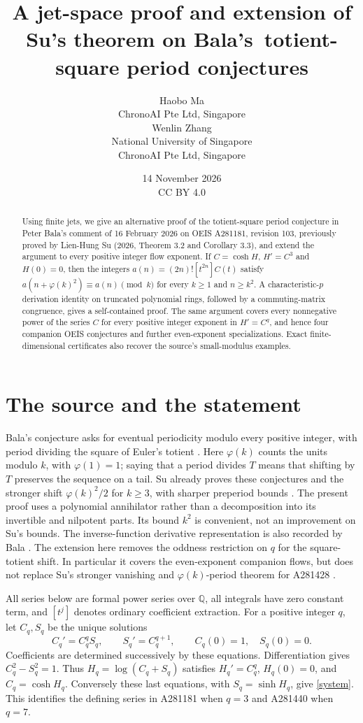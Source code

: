 \documentclass[11pt]{article}
\title{A jet-space proof and extension of Su's theorem on Bala's\ totient-square period conjectures}
\author{Haobo Ma\\\small ChronoAI Pte Ltd, Singapore
  \\[0.5em]Wenlin Zhang\\\small National University of Singapore
  \\\small ChronoAI Pte Ltd, Singapore}
\date{14 November 2026\\\small CC BY 4.0}
\newcommand{\QQ}{\mathbb Q}
\begin{document}
\maketitle
\begin{abstract}
Using finite jets, we give an alternative proof of the totient-square period conjecture in
Peter Bala's comment of 16 February 2026 on OEIS A281181, revision 103,
previously proved by Lien-Hung Su (2026, Theorem 3.2 and Corollary 3.3),
and extend the argument to every positive integer flow exponent.
If $C=\cosh H$, $H'=C^3$ and $H(0)=0$, then the integers
$a(n)=(2n)![t^{2n}]C(t)$ satisfy
$a(n+\varphi(k)^2)\equiv a(n)\pmod{k}$ for every $k\geq1$ and $n\geq k^2$.
A characteristic-$p$ derivation identity on truncated polynomial rings,
followed by a commuting-matrix congruence, gives a self-contained proof.
The same argument covers every nonnegative power of the series $C$
for every positive integer exponent in $H'=C^q$, and hence four companion
OEIS conjectures and further even-exponent specializations.
Exact finite-dimensional certificates also recover
the source's small-modulus examples.
\end{abstract}

\section{The source and the statement}
Bala's conjecture asks for eventual periodicity modulo every positive
integer, with period dividing the square of Euler's totient
\cite{oeis181}. Here $\varphi(k)$ counts the units modulo $k$, with
$\varphi(1)=1$; saying that a period divides $T$ means that shifting by
$T$ preserves the sequence on a tail. Su already proves these conjectures
and the stronger shift $\varphi(k)^2/2$ for $k\geq3$, with sharper
preperiod bounds \cite[Theorem 3.2, Corollary 3.3]{su}.
The present proof uses a polynomial annihilator rather than a decomposition
into its invertible and nilpotent parts. Its bound $k^2$ is convenient,
not an improvement on Su's bounds. The inverse-function derivative
representation is also recorded by Bala \cite[Corollary 1]{bala}.
The extension here removes the oddness restriction on $q$ for the
square-totient shift. In particular it covers the even-exponent companion
flows, but does not replace Su's stronger vanishing and $\varphi(k)$-period
theorem for A281428 \cite[Theorem 4.1]{su}.

All series below are formal power series over $\QQ$, all integrals have
zero constant term, and $[t^j]$ denotes ordinary coefficient extraction.
For a positive integer $q$, let $C_q,S_q$ be the unique solutions
\begin{equation}\label{system}
 C_q'=C_q^qS_q,\qquad S_q'=C_q^{q+1},\qquad
 C_q(0)=1,\quad S_q(0)=0.
\end{equation}
Coefficients are determined successively by these equations. Differentiation
gives $C_q^2-S_q^2=1$. Thus $H_q=\log(C_q+S_q)$ satisfies
$H_q'=C_q^q$, $H_q(0)=0$, and $C_q=\cosh H_q$.
Conversely these last equations, with $S_q=\sinh H_q$, give
\eqref{system}. This identifies the defining series in A281181 when $q=3$
and A281440 when $q=7$.
\end{document}
